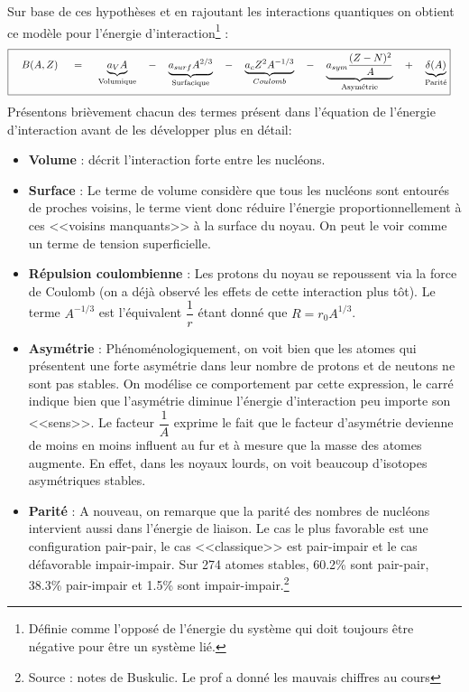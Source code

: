 Sur base de ces hypothèses et en rajoutant les interactions quantiques on obtient ce modèle pour l'énergie d'interaction\footnote{Définie comme l'opposé de l'énergie du système qui doit toujours être négative pour être un système lié.} :
\begin{equation}
\boxed{
    \quad B(A,Z) \quad\; = \;\quad
    \underbrace{a_V A}_{\text{Volumique}}
    \quad -\quad
    \underbrace{a_{surf} A^{2/3}}_{\text{Surfacique}}
    \quad-\quad
    \underbrace{a_c Z^2 A^{-1/3 }}_{Coulomb}
    \quad-\quad 
    \underbrace{a_{sym}\dfrac{(Z-N)^2}{A}}_{\text{Asymétrie}}
    \quad+\quad 
    \underbrace{\delta(A)}_{\text{Parité}}}\quad
    \label{B}
\end{equation}
Présentons brièvement chacun des termes présent dans l'équation de l'énergie d'interaction avant de les développer plus en détail:
\begin{itemize}[label = $\bullet$]
    \item \textbf{Volume} : décrit l'interaction forte entre les nucléons.
    
    \item \textbf{Surface} : Le terme de volume considère que tous les nucléons sont entourés de proches voisins, le terme vient donc réduire l'énergie proportionnellement à ces <<voisins manquants>> à la surface du noyau. On peut le voir comme un terme de tension superficielle.
    
    \item \textbf{Répulsion coulombienne} : Les protons du noyau se repoussent via la force de Coulomb (on a déjà observé les effets de cette interaction plus tôt). Le terme $A^{-1/3}$ est l'équivalent $\dfrac{1}{r}$ étant donné que $R=r_0A^{1/3}$.
    
    \item \textbf{Asymétrie} : Phénoménologiquement, on voit bien que les atomes qui présentent une  forte asymétrie dans leur nombre de protons et de neutons ne sont pas stables. On modélise ce comportement par cette expression, le carré indique bien que l'asymétrie diminue l'énergie d'interaction peu importe son <<sens>>. Le facteur $\dfrac{1}{A}$ exprime le fait que le facteur d'asymétrie devienne de moins en moins influent au fur et à mesure que la masse des atomes augmente. En effet, dans les noyaux lourds, on voit beaucoup d'isotopes asymétriques stables.
    
    \item \textbf{Parité} : A nouveau, on remarque que la parité des nombres de nucléons intervient aussi dans l'énergie de liaison. Le cas le plus favorable est une configuration pair-pair, le cas <<classique>> est pair-impair et le cas défavorable impair-impair. Sur 274 atomes stables, 60.2\% sont pair-pair, 38.3\% pair-impair et 1.5\% sont impair-impair.\footnote{Source : notes de Buskulic. Le prof a donné les mauvais chiffres au cours}
\end{itemize}

